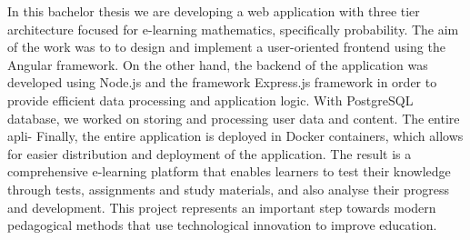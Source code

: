 In this bachelor thesis we are developing a web application with three tier architecture focused
for e-learning mathematics, specifically probability. The aim of the work was to
to design and implement a user-oriented frontend using the Angular framework.
On the other hand, the backend of the application was developed using Node.js and the framework
Express.js framework in order to provide efficient data processing and application logic. With PostgreSQL
database, we worked on storing and processing user data and content. The entire apli-
Finally, the entire application is deployed in Docker containers, which allows for easier distribution
and deployment of the application. The result is a comprehensive e-learning platform that enables
learners to test their knowledge through tests, assignments and study materials,
and also analyse their progress and development. This project represents an important step towards
modern pedagogical methods that use technological innovation to improve
education.